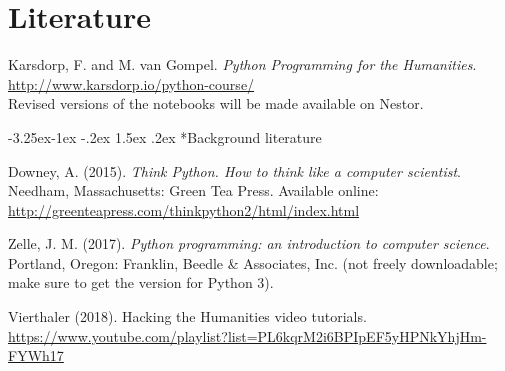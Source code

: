 \documentclass[a4paper,12pt]{article}
\makeatletter
\renewcommand\subsection{\@startsection{subsection}{2}{\z@}%
		{-3.25ex\@plus -1ex \@minus -.2ex}%
		{1.5ex \@plus .2ex}%
		{\normalfont\scshape}}
\makeatother
\begin{document}
\section{Literature}
Karsdorp, F. and M. van Gompel. \emph{Python Programming for the Humanities}.
\url{http://www.karsdorp.io/python-course/} \\
Revised versions of the notebooks will be made available on Nestor.


\subsection*{Background literature}

Downey, A. (2015). \emph{Think Python. How to think like a computer scientist}.
Needham, Massachusetts: Green Tea Press.
Available online: \url{http://greenteapress.com/thinkpython2/html/index.html}

Zelle, J. M. (2017).
\emph{Python programming: an introduction to computer science}.
Portland, Oregon: Franklin, Beedle \& Associates, Inc.
(not freely downloadable; make sure to get the version for Python 3).

Vierthaler (2018). Hacking the Humanities video tutorials.
\url{https://www.youtube.com/playlist?list=PL6kqrM2i6BPIpEF5yHPNkYhjHm-FYWh17}


\pagebreak
\end{document}
